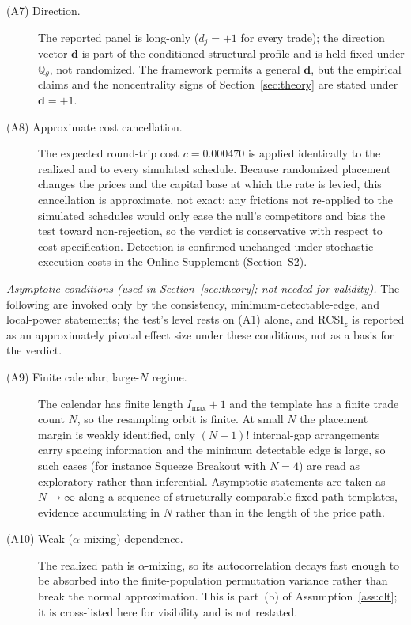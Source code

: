 \documentclass[risks,article,submit,pdftex,oneauthor]{Definitions/mdpi}
\begin{document}
\begin{Assumption}
\begin{description}
\item[(A7) Direction.] The reported panel is long-only ($d_j=+1$ for every
trade); the direction vector $\mathbf d$ is part of the conditioned structural
profile and is held fixed under $\mathbb{Q}_\theta$, not randomized. The
framework permits a general $\mathbf d$, but the empirical claims and the
noncentrality signs of Section~\ref{sec:theory} are stated under $\mathbf d=+1$.

\item[(A8) Approximate cost cancellation.] The expected round-trip cost
$c=0.000470$ is applied identically to the realized and to every simulated
schedule. Because randomized placement changes the prices and the capital base
at which the rate is levied, this cancellation is approximate, not exact; any
frictions not re-applied to the simulated schedules would only ease the null's
competitors and bias the test toward non-rejection, so the verdict is
conservative with respect to cost specification. Detection is confirmed
unchanged under stochastic execution costs in the Online Supplement
(Section~S2).
\end{description}

\medskip
\noindent\emph{Asymptotic conditions (used in Section~\ref{sec:theory}; not
needed for validity).} The following are invoked only by the consistency,
minimum-detectable-edge, and local-power statements; the test's level rests on
(A1) alone, and $\mathrm{RCSI}_z$ is reported as an approximately pivotal
effect size under these conditions, not as a basis for the verdict.

\begin{description}
\item[(A9) Finite calendar; large-$N$ regime.] The calendar has finite length
$I_{\max}+1$ and the template has a finite trade count $N$, so the resampling
orbit is finite. At small $N$ the placement margin is weakly identified, only $(N-1)!$ internal-gap
arrangements carry spacing information and the minimum detectable edge is large, so such
cases (for instance Squeeze Breakout with $N=4$) are read as exploratory rather than
inferential.
Asymptotic statements are taken as $N\to\infty$ along a sequence of structurally
comparable fixed-path templates, evidence accumulating in $N$ rather than in
the length of the price path.

\item[(A10) Weak ($\alpha$-mixing) dependence.] The realized path is
$\alpha$-mixing, so its autocorrelation decays fast enough to be absorbed into
the finite-population permutation variance rather than break the normal
approximation. This is part~(b) of Assumption~\ref{ass:clt}; it is cross-listed
here for visibility and is not restated.


\end{description}
\end{Assumption}
\end{document}

